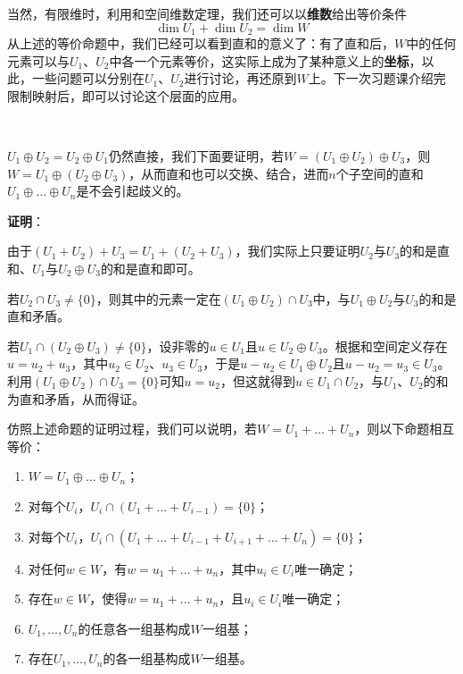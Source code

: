 \documentclass[a4paper,UTF8,fontset=windows,AutoFakeBold]{ctexart}
\newcommand{\proo}[1]{{\vspace{5pt}\kaishu\noindent\textbf{证明}：\vspace{-3pt}
\begin{compactitem}
    \item[] #1
\end{compactitem}
}}
\begin{document}
\noindent 当然，有限维时，利用和空间维数定理，我们还可以以\textbf{维数}给出等价条件
$$\dim U_1+\dim U_2=\dim W$$
从上述的等价命题中，我们已经可以看到直和的意义了：有了直和后，$W$中的任何元素可以与$U_1$、$U_2$中各一个元素等价，这实际上成为了某种意义上的\textbf{坐标}，以此，一些问题可以分别在$U_1$、$U_2$进行讨论，再还原到$W$上。下一次习题课介绍完限制映射后，即可以讨论这个层面的应用。

\

$U_1\oplus U_2=U_2\oplus U_1$仍然直接，我们下面要证明，若$W=(U_1\oplus U_2)\oplus U_3$，则$W=U_1\oplus(U_2\oplus U_3)$，从而直和也可以交换、结合，进而$n$个子空间的直和$U_1\oplus\dots\oplus U_n$是不会引起歧义的。

\proo{
    由于$(U_1+U_2)+U_3=U_1+(U_2+U_3)$，我们实际上只要证明$U_2$与$U_3$的和是直和、$U_1$与$U_2\oplus U_3$的和是直和即可。

    若$U_2\cap U_3\ne\{0\}$，则其中的元素一定在$(U_1\oplus U_2)\cap U_3$中，与$U_1\oplus U_2$与$U_3$的和是直和矛盾。

    若$U_1\cap(U_2\oplus U_3)\ne\{0\}$，设非零的$u\in U_1$且$u\in U_2\oplus U_3$。根据和空间定义存在$u=u_2+u_3$，其中$u_2\in U_2$、$u_3\in U_3$，于是$u-u_2\in U_1\oplus U_2$且$u-u_2=u_3\in U_3$。利用$(U_1\oplus U_2)\cap U_3=\{0\}$可知$u=u_2$，但这就得到$u\in U_1\cap U_2$，与$U_1$、$U_2$的和为直和矛盾，从而得证。
}

仿照上述命题的证明过程，我们可以说明，若$W=U_1+\dots+U_n$，则以下命题相互等价：
\begin{enumerate}
    \item $W=U_1\oplus\dots\oplus U_n$；
    \item 对每个$U_i$，$U_i\cap(U_1+\dots+U_{i-1})=\{0\}$；
    \item 对每个$U_i$，$U_i\cap(U_1+\dots+U_{i-1}+U_{i+1}+\dots+U_n)=\{0\}$；
    \item 对任何$w\in W$，有$w=u_1+\dots+u_n$，其中$u_i\in U_i$唯一确定；
    \item 存在$w\in W$，使得$w=u_1+\dots+u_n$，且$u_i\in U_i$唯一确定；
    \item $U_1,\dots,U_n$的任意各一组基构成$W$一组基；
    \item 存在$U_1,\dots, U_n$的各一组基构成$W$一组基。
\end{enumerate}
\end{document}
